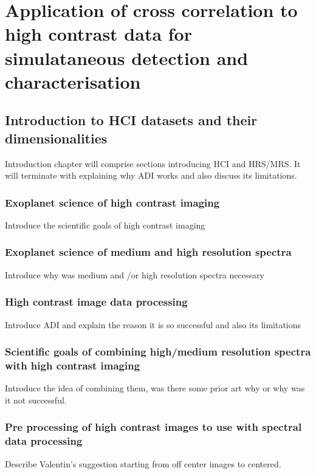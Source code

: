 \part{Application of cross correlation to high contrast data for simulataneous detection and characterisation}
\startcontents[chapters]
\printmyminitoc{
}



\chapter{Introduction to HCI datasets and their dimensionalities}
Introduction chapter will comprise sections introducing HCI and HRS/MRS. 
It will terminate with explaining why ADI works and also discuss its limitations.
\section{Exoplanet science of high contrast imaging}
Introduce the scientific goals of high contrast imaging
\section{Exoplanet science of medium and high resolution spectra }
Introduce why was medium and /or high resolution spectra necessary
\section{High contrast image data processing}
Introduce ADI and explain the reason it is so successful and also its limitations
\section{Scientific goals of combining high/medium resolution spectra with high contrast imaging}
Introduce the idea of combining them, was there some prior art why or why was it not successful.
\section{Pre processing of high contrast images to use with spectral data processing}
Describe Valentin's suggestion starting from off center images to centered.
